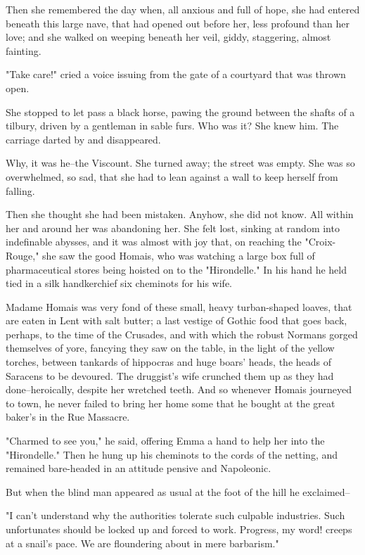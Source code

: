 \documentclass{tufte-book}
\begin{document}
Then she remembered the day when, all anxious and full of hope, she had
entered beneath this large nave, that had opened out before her, less
profound than her love; and she walked on weeping beneath her veil,
giddy, staggering, almost fainting.

"Take care!" cried a voice issuing from the gate of a courtyard that was
thrown open.

She stopped to let pass a black horse, pawing the ground between the
shafts of a tilbury, driven by a gentleman in sable furs. Who was it?
She knew him. The carriage darted by and disappeared.

Why, it was he--the Viscount. She turned away; the street was empty. She
was so overwhelmed, so sad, that she had to lean against a wall to keep
herself from falling.

Then she thought she had been mistaken. Anyhow, she did not know. All
within her and around her was abandoning her. She felt lost, sinking
at random into indefinable abysses, and it was almost with joy that, on
reaching the "Croix-Rouge," she saw the good Homais, who was watching
a large box full of pharmaceutical stores being hoisted on to the
"Hirondelle." In his hand he held tied in a silk handkerchief six
cheminots for his wife.

Madame Homais was very fond of these small, heavy turban-shaped loaves,
that are eaten in Lent with salt butter; a last vestige of Gothic food
that goes back, perhaps, to the time of the Crusades, and with which
the robust Normans gorged themselves of yore, fancying they saw on the
table, in the light of the yellow torches, between tankards of hippocras
and huge boars' heads, the heads of Saracens to be devoured. The
druggist's wife crunched them up as they had done--heroically, despite
her wretched teeth. And so whenever Homais journeyed to town, he never
failed to bring her home some that he bought at the great baker's in the
Rue Massacre.

"Charmed to see you," he said, offering Emma a hand to help her into the
"Hirondelle." Then he hung up his cheminots to the cords of the netting,
and remained bare-headed in an attitude pensive and Napoleonic.

But when the blind man appeared as usual at the foot of the hill he
exclaimed--

"I can't understand why the authorities tolerate such culpable
industries. Such unfortunates should be locked up and forced to work.
Progress, my word! creeps at a snail's pace. We are floundering about in
mere barbarism."
\end{document}
